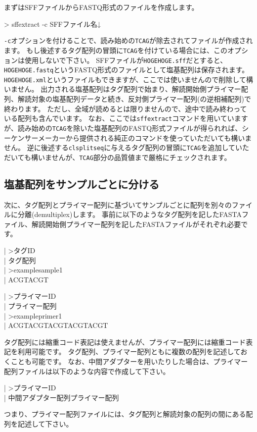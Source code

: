 \documentclass[titlepage,10pt,a4paper]{jsbook}
\newenvironment{content}{\begin{shaded}\vspace{-1em}\raggedright\ttfamily\footnotesize\setlength{\baselineskip}{1.4em}}{\end{shaded}\vspace{-1em}}
\newenvironment{cmd}{\begin{oframed}\raggedright\ttfamily\footnotesize\setlength{\baselineskip}{1.4em}}{\end{oframed}\vspace{-1em}}
\begin{document}
まずはSFFファイルからFASTQ形式のファイルを作成します。
\begin{cmd}
{\textgreater} sff{\textunderscore}extract -c SFFファイル名↓
\end{cmd}
\texttt{-c}オプションを付けることで、読み始めの\texttt{TCAG}が除去されてファイルが作成されます。
もし後述するタグ配列の冒頭に\texttt{TCAG}を付けている場合には、このオプションは使用しないで下さい。
SFFファイルが\texttt{HOGEHOGE.sff}だとすると、\texttt{HOGEHOGE.fastq}というFASTQ形式のファイルとして塩基配列は保存されます。
\texttt{HOGEHOGE.xml}というファイルもできますが、ここでは使いませんので削除して構いません。
出力される塩基配列はタグ配列で始まり、解読開始側プライマー配列、解読対象の塩基配列データと続き、反対側プライマー配列(の逆相補配列)で終わります。
ただし、全域が読めるとは限りませんので、途中で読み終わっている配列も含んでいます。
なお、ここでは\texttt{sff{\textunderscore}extract}コマンドを用いていますが、読み始めの\texttt{TCAG}を除いた塩基配列のFASTQ形式ファイルが得られれば、シーケンサーメーカーから提供される純正のコマンドを使っていただいても構いません。
逆に後述する\texttt{clsplitseq}に与えるタグ配列の冒頭に\texttt{TCAG}を追加していただいても構いませんが、\texttt{TCAG}部分の品質値まで厳格にチェックされます。

\subsection{塩基配列をサンプルごとに分ける}

次に、タグ配列とプライマー配列に基づいてサンプルごとに配列を別々のファイルに分離(demultiplex)します。
事前に以下のようなタグ配列を記したFASTAファイル、解読開始側プライマー配列を記したFASTAファイルがそれぞれ必要です。
\begin{content}
| {\textgreater}タグID\\
| タグ配列\\
| {\textgreater}examplesample1\\
| ACGTACGT
\end{content}
\begin{content}
| {\textgreater}プライマーID\\
| プライマー配列\\
| {\textgreater}exampleprimer1\\
| ACGTACGTACGTACGTACGT
\end{content}
タグ配列には縮重コード表記は使えませんが、プライマー配列には縮重コード表記を利用可能です。
タグ配列、プライマー配列ともに複数の配列を記述しておくことも可能です。
なお、中間アダプターを用いたりした場合は、プライマー配列ファイルは以下のような内容で作成して下さい。
\begin{content}
| {\textgreater}プライマーID\\
| 中間アダプター配列プライマー配列
\end{content}
つまり、プライマー配列ファイルには、タグ配列と解読対象の配列の間にある配列を記述して下さい。
\end{document}
